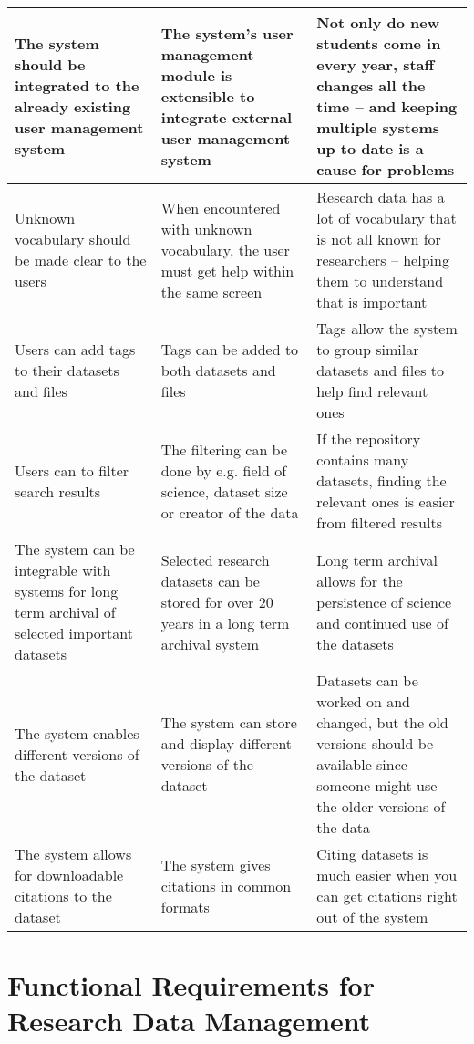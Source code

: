 \begin{tabularx}{\textwidth}{| >{\raggedright}p{3cm} | >{\raggedright}p{3cm} | X |}
    \hline
    \rowcolor{Gray}
    The system should be integrated to the already existing user management system   &The system’s user management module is extensible to integrate external user management system & Not only do new students come in every year, staff changes all the time – and keeping multiple systems up to date is a cause for problems\\
    \hline
    Unknown vocabulary should be made clear to the users  &When encountered with unknown vocabulary, the user must get help within the same screen  & Research data has a lot of vocabulary that is not all known for researchers – helping them to understand that is important\\
    \hline
    \rowcolor{Gray}
    Users can add tags to their datasets and files        &Tags can be added to both datasets and files & Tags allow the system to group similar datasets and files to help find relevant ones\\
    \hline
    Users can to filter search results & The filtering can be done by e.g. field of science, dataset size or creator of the data& If the repository contains many datasets, finding the relevant ones is easier from filtered results\\
    \hline
    \rowcolor{Gray}
    The system can be integrable with systems for long term archival of selected important datasets  &Selected research datasets can be stored for over 20 years in a long term archival system& Long term archival allows for the persistence of science and continued use of the datasets\\
    \hline
    The system enables different versions of the dataset &The system can store and display different versions of the dataset & Datasets can be worked on and changed, but the old versions should be available since someone might use the older versions of the data\\
    \hline
    \rowcolor{Gray}
    The system allows for downloadable citations to the dataset   &The system gives citations in common formats & Citing datasets is much easier when you can get citations right out of the system\\
    \hline
\end{tabularx}

\pagebreak

\section[Research Data Management]{Functional Requirements for Research Data Management}

